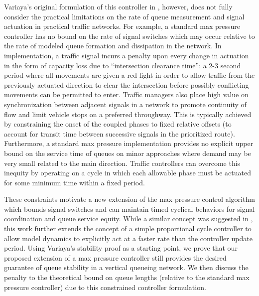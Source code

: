 Variaya's original formulation of this controller in \cite{MaxPressureStochastic}, however, does not fully consider the practical limitations on the rate of queue measurement and signal actuation in practical traffic networks. For example, a standard max pressure controller has no bound on the rate of signal switches which may occur relative to the rate of modeled queue formation and dissipation in the network. In implementation, a traffic signal incurs a penalty upon every change in actuation in the form of capacity loss due to ``intersection clearance time'': a 2-3 second period where all movements are given a red light in order to allow traffic from the previously actuated direction to clear the intersection before possibly conflicting movements can be permitted to enter. Traffic managers also place high value on synchronization between adjacent signals in a network to promote continuity of flow and limit vehicle stops on a preferred throughway. This is typically achieved by constraining the onset of the coupled phases to fixed relative offsets (to account for transit time between successive signals in the prioritized route). Furthermore, a standard max pressure implementation provides no explicit upper bound on the service time of queues on minor approaches where demand may be very small related to the main direction. Traffic controllers can overcome this inequity by operating on a cycle in which each allowable phase must be actuated for some minimum time within a fixed period.

These constraints motivate a new extension of the max pressure control algorithm which bounds signal switches and can maintain timed cyclical behaviors for signal coordination and queue service equity. While a similar concept was suggested in \cite{MaxPressureStochastic}, this work further extends the concept of a simple proportional cycle controller to allow model dynamics to explicitly act at a faster rate than the controller update period. Using Variaya's stability proof as a starting point, we prove that our proposed extension of a max pressure controller still provides the desired guarantee of queue stability in a vertical queueing network. We then discuss the penalty to the theoretical bound on queue lengths (relative to the standard max pressure controller) due to this constrained controller formulation. 


